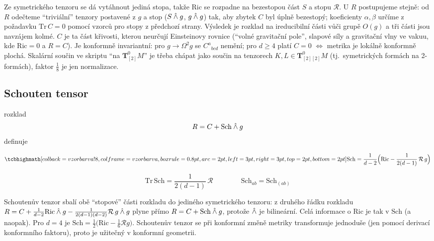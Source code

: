 \begin{vysvetleni}
Ze symetrického tenzoru se dá vytáhnout jediná stopa, takže $\mathrm{Ric}$ se rozpadne na bezestopou část $S$ a stopu $\mathcal{R}$. U $R$ postupujeme stejně: od $R$ odečteme ``triviální'' tenzory postavené z $g$ a stop ($S\owedge g$, $g\owedge g$) tak, aby zbytek $C$ byl úplně bezestopý; koeficienty $\alpha,\beta$ určíme z požadavku $\mathrm{Tr}\,C=0$ pomocí vzorců pro stopy z předchozí strany. Výsledek je rozklad na ireducibilní části vůči grupě $O(g)$ a tři části jsou navzájem kolmé.
 $C$ je ta část křivosti, kterou neurčují Einsteinovy rovnice (``volné gravitační pole'', slapové síly a gravitační vlny ve vakuu, kde $\mathrm{Ric}=0$ a $R=C$). Je konformně invariantní: pro $g\to\Omega^2g$ se $C^{a}{}_{bcd}$ nemění; pro $d\geq4$ platí $C=0$ $\Leftrightarrow$ metrika je lokálně konformně plochá. Skalární součin ve skriptu ``na $\mathbf{T}^0_{[2]}M$'' je třeba chápat jako součin na tenzorech $K,L\in\mathbf{T}^0_{[2][2]}M$ (tj.\ symetrických formách na 2-formách), faktor $\tfrac18$ je jen normalizace.
\end{vysvetleni}

\subsection*{Schouten tensor}
rozklad
\[
  R = C + \mathrm{Sch}\owedge g
\]
definuje 
\begin{definice}
\[
  \vzorec{\mathrm{Sch} = \frac{1}{d-2}\Big(\mathrm{Ric} - \frac{1}{2(d-1)}\,\mathcal{R}\,g\Big)}
\]
\end{definice}
\[
  \mathrm{Tr}\,\mathrm{Sch} = \frac{1}{2(d-1)}\,\mathcal{R} \qquad\qquad \mathrm{Sch}_{ab} = \mathrm{Sch}_{(ab)}
\]

\begin{vysvetleni}
Schoutenův tenzor sbalí obě ``stopové'' části rozkladu do jediného symetrického tenzoru: z druhého řádku rozkladu $R=C+\frac{1}{d-2}\mathrm{Ric}\owedge g-\frac{1}{2(d-1)(d-2)}\mathcal{R}\,g\owedge g$ plyne přímo $R=C+\mathrm{Sch}\owedge g$, protože $\owedge$ je bilineární. Celá informace o $\mathrm{Ric}$ je tak v $\mathrm{Sch}$ (a naopak). Pro $d=4$ je $\mathrm{Sch}=\tfrac12\big(\mathrm{Ric}-\tfrac16\mathcal{R}g\big)$. Schoutenův tenzor se při konformní změně metriky transformuje jednoduše (jen pomocí derivací konformního faktoru), proto je užitečný v konformní geometrii.
\end{vysvetleni}

